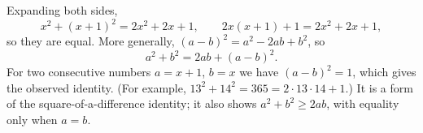 Expanding both sides,
\[
x^2+(x+1)^2=2x^2+2x+1,\qquad 2x(x+1)+1=2x^2+2x+1,
\]
so they are equal. More generally, $(a-b)^2=a^2-2ab+b^2$, so
\[
a^2+b^2=2ab+(a-b)^2 .
\]
For two consecutive numbers $a=x+1$, $b=x$ we have $(a-b)^2=1$, which gives the observed identity. (For example, $13^2+14^2=365=2\cdot13\cdot14+1$.) It is a form of the square-of-a-difference identity; it also shows $a^2+b^2\ge2ab$, with equality only when $a=b$.
